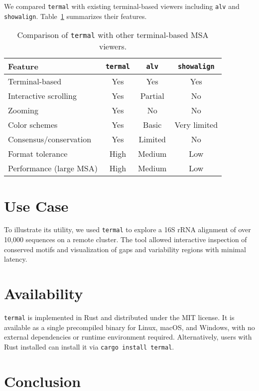 \documentclass[11pt]{article}
\begin{document}
We compared \texttt{termal} with existing terminal-based viewers including
\texttt{alv} and \texttt{showalign}. Table~\ref{tab:comparison} summarizes their
features.

\begin{table}[h]
\centering
\begin{tabular}{lccc}
\hline
Feature & \texttt{termal} & \texttt{alv} & \texttt{showalign} \\
\hline
Terminal-based        & Yes  & Yes  & Yes \\
Interactive scrolling & Yes  & Partial & No \\
Zooming               & Yes  & No   & No \\
Color schemes         & Yes  & Basic & Very limited \\
Consensus/conservation & Yes & Limited & No \\
Format tolerance      & High & Medium & Low \\
Performance (large MSA) & High & Medium & Low \\
\hline
\end{tabular}
\caption{Comparison of \texttt{termal} with other terminal-based MSA viewers.}
\label{tab:comparison}
\end{table}

\section*{Use Case}

To illustrate its utility, we used \texttt{termal} to explore a 16S rRNA
alignment of over 10,000 sequences on a remote cluster. The tool allowed
interactive inspection of conserved motifs and visualization of gaps and
variability regions with minimal latency.

\section*{Availability}

\texttt{termal} is implemented in Rust and distributed under the MIT license. It
is available as a single precompiled binary for Linux, macOS, and Windows, with
no external dependencies or runtime environment required. Alternatively, users
with Rust installed can install it via \texttt{cargo install termal}.

\section*{Conclusion}
\end{document}
